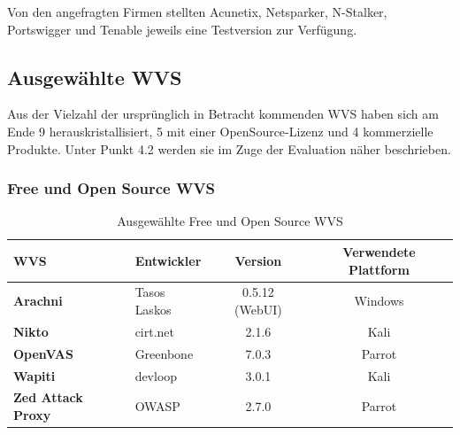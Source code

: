 \documentclass[12pt,oneside,a4paper,parskip,pointlessnumbers]{scrbook}
\begin{document}
  Von den angefragten Firmen stellten Acunetix, Netsparker, N-Stalker, Portswigger und Tenable jeweils eine Testversion zur Verfügung.

  \subsection{Ausgewählte WVS}
  Aus der Vielzahl der ursprünglich in Betracht kommenden WVS haben sich am Ende 9 herauskristallisiert, 5 mit einer OpenSource-Lizenz und 4 kommerzielle Produkte. Unter Punkt 4.2 werden sie im Zuge der Evaluation näher beschrieben.
    \subsubsection{Free und Open Source WVS}
      \begin{table}[H]
        \centering
          \begin{tabular}{|l|l|c|c|}
            \hline
            \textbf{WVS}              & \textbf{Entwickler}  & \textbf{Version}     & \textbf{Verwendete Plattform}  \\
            \hline
            \textbf{Arachni}          & Tasos Laskos         & 0.5.12 (WebUI)       & Windows                       \\
            \hline
            \textbf{Nikto}            & cirt.net             & 2.1.6                & Kali                          \\
            \hline
            \textbf{OpenVAS}          & Greenbone            & 7.0.3                & Parrot                        \\
            \hline
            \textbf{Wapiti}           & devloop              & 3.0.1                & Kali                          \\
            \hline
            \textbf{Zed Attack Proxy} & OWASP                & 2.7.0                & Parrot                        \\
            \hline
          \end{tabular}
        \caption[Ausgewählte Free und Open Source WVS]{Ausgewählte Free und Open Source WVS}
      \end{table}
\end{document}

